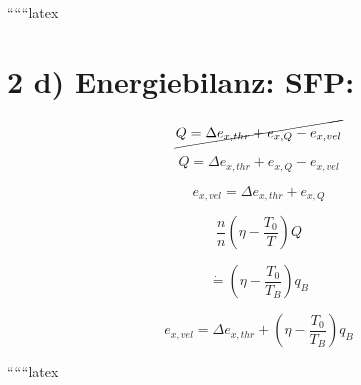 ``````latex


\section*{2 d) Energiebilanz: SFP:}

\[
\cancel{Q = \Delta e_{x, thr} + e_{x, Q} - e_{x, vel}}
\]

\[
Q = \Delta e_{x, thr} + e_{x, Q} - e_{x, vel}
\]

\[
e_{x, vel} = \Delta e_{x, thr} + e_{x, Q}
\]

\[
\frac{n}{n} \left( \eta - \frac{T_0}{T} \right) Q
\]

\[
\dot{=}\left( \eta - \frac{T_0}{T_B} \right) q_{B}
\]

\[
e_{x, vel} = \Delta e_{x, thr} + \left( \eta - \frac{T_0}{T_B} \right) q_{B}
\]

``````latex


